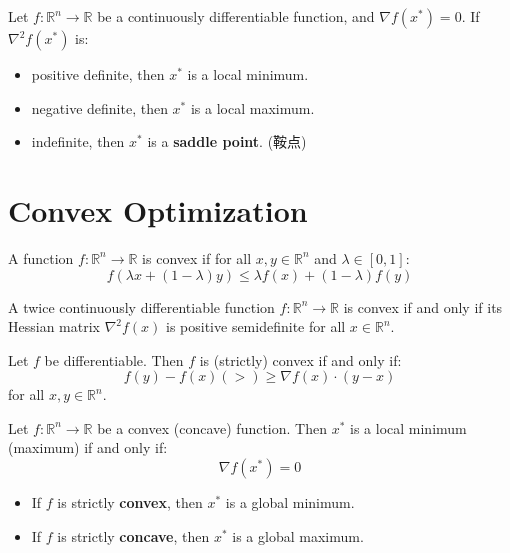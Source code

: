\begin{proposition}
    Let $f: \mathbb{R}^n \to \mathbb{R}$ be a continuously differentiable function, and $\nabla f(x^*) = 0$. If $\nabla^2 f(x^*)$ is:
    \begin{itemize}
        \item positive definite, then $x^*$ is a local minimum.
        \item negative definite, then $x^*$ is a local maximum.
        \item indefinite, then $x^*$ is a \textbf{saddle point}. (鞍点)
    \end{itemize} 
\end{proposition}

\section{Convex Optimization}
\begin{definition}
    A function $f: \mathbb{R}^n \to \mathbb{R}$ is convex if for all $x, y \in \mathbb{R}^n$ and $\lambda \in [0, 1]$:
    $$f(\lambda x + (1 - \lambda) y) \leq \lambda f(x) + (1 - \lambda) f(y)$$
\end{definition}
\begin{theorem}
    A twice continuously differentiable function $f: \mathbb{R}^n \to \mathbb{R}$ is convex if and only if its Hessian matrix $\nabla^2 f(x)$ is positive semidefinite for all $x \in \mathbb{R}^n$.
\end{theorem}

\begin{proposition}
    Let $f$ be differentiable. Then $f$ is (strictly) convex if and only if:
    $$ f(y) - f(x) (>) \geq \nabla f(x) \cdot (y - x) $$
    for all $x, y \in \mathbb{R}^n$.
\end{proposition}
\begin{theorem}
    Let $f: \mathbb{R}^n \to \mathbb{R}$ be a convex (concave) function. Then $x^*$ is a local minimum (maximum) if and only if:
    $$\nabla f(x^*) = 0$$
    \begin{itemize}
        \item If $f$ is strictly \textbf{convex}, then $x^*$ is a global minimum.
        \item If $f$ is strictly \textbf{concave}, then $x^*$ is a global maximum.
    \end{itemize}
\end{theorem}
